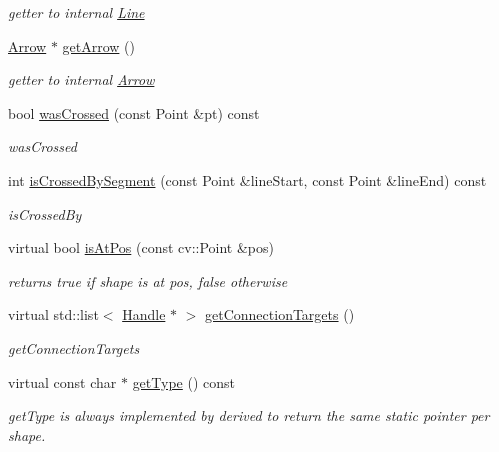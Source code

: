\begin{DoxyCompactItemize}
\begin{DoxyCompactList}\small\item\em getter to internal \hyperlink{classcanvascv_1_1Line}{Line} \end{DoxyCompactList}\item 
\hyperlink{classcanvascv_1_1Arrow}{Arrow} $\ast$ \hyperlink{classcanvascv_1_1LineCrossing_a37e267229ce3c0f326b002c4cff7a4ab}{get\+Arrow} ()\hypertarget{classcanvascv_1_1LineCrossing_a37e267229ce3c0f326b002c4cff7a4ab}{}\label{classcanvascv_1_1LineCrossing_a37e267229ce3c0f326b002c4cff7a4ab}

\begin{DoxyCompactList}\small\item\em getter to internal \hyperlink{classcanvascv_1_1Arrow}{Arrow} \end{DoxyCompactList}\item 
bool \hyperlink{classcanvascv_1_1LineCrossing_aced09c16d3b9ccaae29c02ac02147ee9}{was\+Crossed} (const Point \&pt) const 
\begin{DoxyCompactList}\small\item\em was\+Crossed \end{DoxyCompactList}\item 
int \hyperlink{classcanvascv_1_1LineCrossing_a940cbb0be9bea9acbd82493916b1b3d6}{is\+Crossed\+By\+Segment} (const Point \&line\+Start, const Point \&line\+End) const 
\begin{DoxyCompactList}\small\item\em is\+Crossed\+By \end{DoxyCompactList}\item 
virtual bool \hyperlink{classcanvascv_1_1LineCrossing_a5dcddad51aedc5f860a21d191266e862}{is\+At\+Pos} (const cv\+::\+Point \&pos)\hypertarget{classcanvascv_1_1LineCrossing_a5dcddad51aedc5f860a21d191266e862}{}\label{classcanvascv_1_1LineCrossing_a5dcddad51aedc5f860a21d191266e862}

\begin{DoxyCompactList}\small\item\em returns true if shape is at pos, false otherwise \end{DoxyCompactList}\item 
virtual std\+::list$<$ \hyperlink{classcanvascv_1_1Handle}{Handle} $\ast$ $>$ \hyperlink{classcanvascv_1_1LineCrossing_a8428e287e407e07cfaf11ea6d655e0e6}{get\+Connection\+Targets} ()
\begin{DoxyCompactList}\small\item\em get\+Connection\+Targets \end{DoxyCompactList}\item 
virtual const char $\ast$ \hyperlink{classcanvascv_1_1LineCrossing_a86757b4f629d3d03885f62976d5b7fc3}{get\+Type} () const 
\begin{DoxyCompactList}\small\item\em get\+Type is always implemented by derived to return the same static pointer per shape. \end{DoxyCompactList}\end{DoxyCompactItemize}
